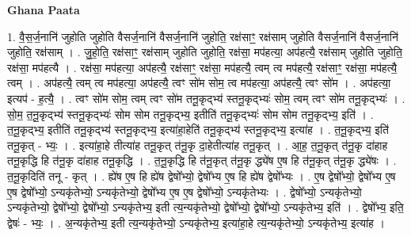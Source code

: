 \documentclass[17pt]{extarticle}
\begin{document}
\textbf{Ghana Paata } \newline

1. वै॒स॒र्ज॒नानि॑ जुहोति जुहोति वैसर्ज॒नानि॑ वैसर्ज॒नानि॑ जुहोति॒ रक्ष॑साꣳ॒॒ रक्ष॑साम् जुहोति वैसर्ज॒नानि॑ वैसर्ज॒नानि॑ जुहोति॒ रक्ष॑साम् । . जु॒हो॒ति॒ रक्ष॑साꣳ॒॒ रक्ष॑साम् जुहोति जुहोति॒ रक्ष॑सा॒ मप॑हत्या॒ अप॑हत्यै॒ रक्ष॑साम् जुहोति जुहोति॒ रक्ष॑सा॒ मप॑हत्यै । . रक्ष॑सा॒ मप॑हत्या॒ अप॑हत्यै॒ रक्ष॑साꣳ॒॒ रक्ष॑सा॒ मप॑हत्यै॒ त्वम् त्व मप॑हत्यै॒ रक्ष॑साꣳ॒॒ रक्ष॑सा॒ मप॑हत्यै॒ त्वम् । . अप॑हत्यै॒ त्वम् त्व मप॑हत्या॒ अप॑हत्यै॒ त्वꣳ सो॑म सोम॒ त्व मप॑हत्या॒ अप॑हत्यै॒ त्वꣳ सो॑म । . अप॑हत्या॒ इत्यप॑ - ह॒त्यै॒ । . त्वꣳ सो॑म सोम॒ त्वम् त्वꣳ सो॑म तनू॒कृद्भ्य॑ स्तनू॒कृद्भ्यः॑ सोम॒ त्वम् त्वꣳ सो॑म तनू॒कृद्भ्यः॑ । . सो॒म॒ त॒नू॒कृद्भ्य॑ स्तनू॒कृद्भ्यः॑ सोम सोम तनू॒कृद्भ्य॒ इतीति॑ तनू॒कृद्भ्यः॑ सोम सोम तनू॒कृद्भ्य॒ इति॑ । . त॒नू॒कृद्भ्य॒ इतीति॑ तनू॒कृद्भ्य॑ स्तनू॒कृद्भ्य॒ इत्या॑हा॒हेति॑ तनू॒कृद्भ्य॑ स्तनू॒कृद्भ्य॒ इत्या॑ह । . त॒नू॒कृद्भ्य॒ इति॑ तनू॒कृत् - भ्यः॒ । . इत्या॑हा॒हे तीत्या॑ह तनू॒कृत् त॑नू॒कृ दा॒हेतीत्या॑ह तनू॒कृत् । . आ॒ह॒ त॒नू॒कृत् त॑नू॒कृ दा॑हाह तनू॒कृद्धि हि त॑नू॒कृ दा॑हाह तनू॒कृद्धि । . त॒नू॒कृद्धि हि त॑नू॒कृत् त॑नू॒कृ द्ध्ये॑ष ए॒ष हि त॑नू॒कृत् त॑नू॒कृ द्ध्ये॑षः । . त॒नू॒कृदिति॑ तनू - कृत् । . ह्ये॑ष ए॒ष हि ह्ये॑ष द्वेषो᳚भ्यो॒ द्वेषो᳚भ्य ए॒ष हि ह्ये॑ष द्वेषो᳚भ्यः । . ए॒ष द्वेषो᳚भ्यो॒ द्वेषो᳚भ्य ए॒ष ए॒ष द्वेषो᳚भ्यो॒ ऽन्यकृ॑तेभ्यो॒ ऽन्यकृ॑तेभ्यो॒ द्वेषो᳚भ्य ए॒ष ए॒ष द्वेषो᳚भ्यो॒ ऽन्यकृ॑तेभ्यः । . द्वेषो᳚भ्यो॒ ऽन्यकृ॑तेभ्यो॒ ऽन्यकृ॑तेभ्यो॒ द्वेषो᳚भ्यो॒ द्वेषो᳚भ्यो॒ ऽन्यकृ॑तेभ्य॒ इती त्य॒न्यकृ॑तेभ्यो॒ द्वेषो᳚भ्यो॒ द्वेषो᳚भ्यो॒ ऽन्यकृ॑तेभ्य॒ इति॑ । . द्वेषो᳚भ्य॒ इति॒ द्वेषः॑ - भ्यः॒ । . अ॒न्यकृ॑तेभ्य॒ इती त्य॒न्यकृ॑तेभ्यो॒ ऽन्यकृ॑तेभ्य॒ इत्या॑हा॒हे त्य॒न्यकृ॑तेभ्यो॒ ऽन्यकृ॑तेभ्य॒ इत्या॑ह । \newline
\end{document}
